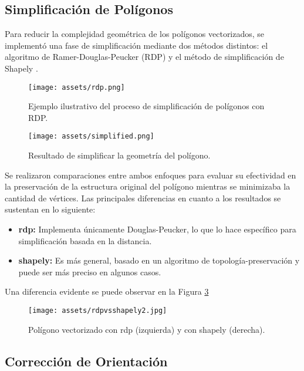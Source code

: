 \documentclass[twocolumn, fontsize=10pt]{article}
\begin{document}
\subsection{Simplificación de Polígonos}

Para reducir la complejidad geométrica de los polígonos vectorizados, se implementó una fase de simplificación mediante dos métodos distintos: el algoritmo de Ramer-Douglas-Peucker (RDP) \cite{rdp} y el método de simplificación de Shapely \cite{shapely}. 

\begin{figure}[H]
    \centering
    \texttt{[image: assets/rdp.png]}
    \caption{Ejemplo ilustrativo del proceso de simplificación de polígonos con RDP.}
    \label{fig:rdp}
\end{figure}

\begin{figure}[H]
    \centering
    \texttt{[image: assets/simplified.png]}
    \caption{Resultado de simplificar la geometría del polígono.}
    \label{fig:simplified}
\end{figure}

Se realizaron comparaciones entre ambos enfoques para evaluar su efectividad en la preservación de la estructura original del polígono mientras se minimizaba la cantidad de vértices. Las principales diferencias en cuanto a los resultados se sustentan en lo siguiente:

\begin{itemize}
    \item \textbf{rdp:} Implementa únicamente Douglas-Peucker, lo que lo hace específico para simplificación basada en la distancia.

\item \textbf{shapely:} Es más general, basado en un algoritmo de topología-preservación y puede ser más preciso en algunos casos.
\end{itemize}

Una diferencia evidente se puede observar en la Figura \ref{fig:rdpvsshapely}

\begin{figure}[H]
    \centering
    \texttt{[image: assets/rdpvsshapely2.jpg]}
    \caption{Polígono vectorizado con rdp (izquierda) y con shapely (derecha).}
    \label{fig:rdpvsshapely}
\end{figure}

\subsection{Corrección de Orientación}
\end{document}
